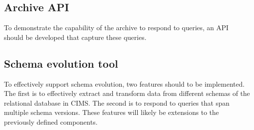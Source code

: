 \subsection{Archive API}
To demonstrate the capability of the archive to respond to queries, an API should be developed that capture these queries. 

\subsection{Schema evolution tool}
To effectively support schema evolution, two features should to be implemented. The first is to effectively extract and transform data from different schemas of the relational database in CIMS. The second is to respond to queries that span multiple schema versions. These features will likely be extensions to the previously defined components.




